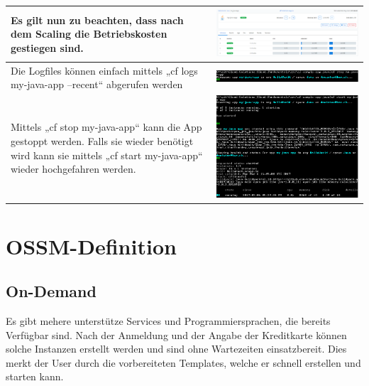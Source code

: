 \begin{longtable}{| p{5cm} | p{11cm} |}
Es gilt nun zu beachten, dass nach dem Scaling die Betriebskosten gestiegen sind. &\includegraphics[width=0.65\columnwidth, valign=T]{images/image18.png} \\ \hline
Die Logfiles können einfach mittels „cf logs my-java-app --recent“ abgerufen werden &\includegraphics[width=0.65\columnwidth, valign=T]{images/image19.png} \\ \hline
Mittels „cf stop my-java-app“ kann die App gestoppt werden. Falls sie wieder benötigt wird kann sie mittels „cf start my-java-app“ wieder hochgefahren werden. 
&\includegraphics[width=0.65\columnwidth, valign=T]{images/image20.png} \\ \hline
\end{longtable}
\chapter{OSSM-Definition}
\section{On-Demand}
Es gibt mehere unterstütze Services und Programmiersprachen, die bereits Verfügbar sind. Nach der Anmeldung und der Angabe der Kreditkarte können solche Instanzen erstellt werden und sind ohne Wartezeiten einsatzbereit. Dies merkt der User durch die vorbereiteten Templates, welche er schnell erstellen und starten kann.
